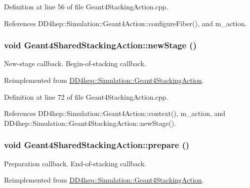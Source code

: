 Definition at line 56 of file Geant4StackingAction.cpp.

References DD4hep::Simulation::Geant4Action::configureFiber(), and m\_\-action.\hypertarget{class_d_d4hep_1_1_simulation_1_1_geant4_shared_stacking_action_af92666552c404908a7e99c8145846c5f}{
\subsubsection[{newStage}]{\setlength{\rightskip}{0pt plus 5cm}void Geant4SharedStackingAction::newStage ()}}
\label{class_d_d4hep_1_1_simulation_1_1_geant4_shared_stacking_action_af92666552c404908a7e99c8145846c5f}


New-\/stage callback. Begin-\/of-\/stacking callback. 

Reimplemented from \hyperlink{class_d_d4hep_1_1_simulation_1_1_geant4_stacking_action_a2709ba86b13b0574dcd1d8e580209d0b}{DD4hep::Simulation::Geant4StackingAction}.

Definition at line 72 of file Geant4StackingAction.cpp.

References DD4hep::Simulation::Geant4Action::context(), m\_\-action, and DD4hep::Simulation::Geant4StackingAction::newStage().\hypertarget{class_d_d4hep_1_1_simulation_1_1_geant4_shared_stacking_action_a22e3516dfed160da7a3b246d28098891}{
\subsubsection[{prepare}]{\setlength{\rightskip}{0pt plus 5cm}void Geant4SharedStackingAction::prepare ()}}
\label{class_d_d4hep_1_1_simulation_1_1_geant4_shared_stacking_action_a22e3516dfed160da7a3b246d28098891}


Preparation callback. End-\/of-\/stacking callback. 

Reimplemented from \hyperlink{class_d_d4hep_1_1_simulation_1_1_geant4_stacking_action_a3974c0e7b737bdccced8c196fc316b5b}{DD4hep::Simulation::Geant4StackingAction}.


